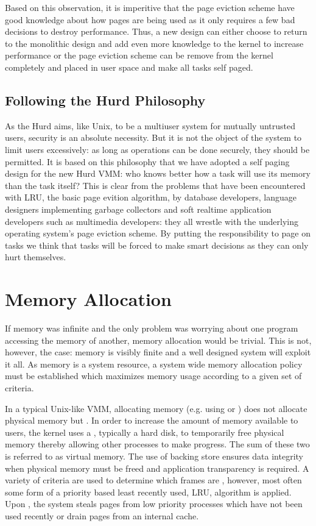 Based on this observation, it is imperitive that the page eviction
scheme have good knowledge about how pages are being used as it only
requires a few bad decisions to destroy performance.  Thus, a new
design can either choose to return to the monolithic design and add
even more knowledge to the kernel to increase performance or the page
eviction scheme can be remove from the kernel completely and placed in
user space and make all tasks self paged.

\subsection{Following the Hurd Philosophy}

As the Hurd aims, like Unix, to be a multiuser system for mutually
untrusted users, security is an absolute necessity.  But it is not the
object of the system to limit users excessively: as long as operations
can be done securely, they should be permitted.  It is based on this
philosophy that we have adopted a self paging design for the new Hurd
VMM: who knows better how a task will use its memory than the task
itself?  This is clear from the problems that have been encountered
with LRU, the basic page evition algorithm, by database developers,
language designers implementing garbage collectors and soft realtime
application developers such as multimedia developers: they all wrestle
with the underlying operating system's page eviction scheme.  By
putting the responsibility to page on tasks we think that tasks will
be forced to make smart decisions as they can only hurt themselves.

\section{Memory Allocation}

If memory was infinite and the only problem was worrying about one
program accessing the memory of another, memory allocation would be
trivial.  This is not, however, the case: memory is visibly finite and
a well designed system will exploit it all.  As memory is a system
resource, a system wide memory allocation policy must be established
which maximizes memory usage according to a given set of criteria.

In a typical Unix-like VMM, allocating memory (e.g. using
 or ) does not allocate physical memory
but .  In order to increase the amount of
memory available to users, the kernel uses a ,
typically a hard disk, to temporarily free physical memory thereby
allowing other processes to make progress.  The sum of these two is
referred to as virtual memory.  The use of backing store ensures data
integrity when physical memory must be freed and application
transparency is required.  A variety of criteria are used to determine
which frames are , however, most often some form of
a priority based least recently used, LRU, algorithm is applied.  Upon
, the system steals pages from low priority
processes which have not been used recently or drain pages from an
internal cache.


